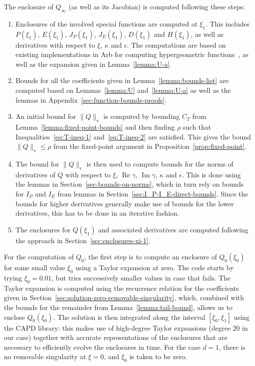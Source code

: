 \documentclass[11pt]{article}
\DeclareMathOperator{\real}{Re}
\DeclareMathOperator{\imag}{Im}
\newcommand{\normv}{\mathrm{v}}
\newcommand{\codenumber}[1]{#1} %
\begin{document}
The enclosure of \(Q_{\infty}\) (as well as its Jacobian) is computed
following these steps:
\begin{enumerate}
\item Enclosures of the involved special functions are computed at
  \(\xi_{1}\). This includes \(P(\xi_{1})\), \(E(\xi_{1})\),
  \(J_{P}(\xi_{1})\), \(J_{E}(\xi_{1})\), \(D(\xi_{1})\) and
  \(H(\xi_{1})\), as well as derivatives with respect to \(\xi\),
  \(\kappa\) and \(\epsilon\). The computations are based on existing
  implementations in Arb for computing hypergeometric
  functions~\cite{Johansson2019}, as well as the expansion given in
  Lemma~\ref{lemma:U-a}.
\item Bounds for all the coefficients given in
  Lemma~\ref{lemma:bounds-list} are computed based on
  Lemmas~\ref{lemma:U} and~\ref{lemma:U-a} as well as the lemmas in
  Appendix~\ref{sec:function-bounds-proofs}.
\item An initial bound for \(\|Q\|_{\normv}\) is computed by bounding
  \(C_{T}\) from Lemma~\ref{lemma:fixed-point-bounds} and then finding
  \(\rho\) such that Inequalities~\eqref{eq:T-ineq-1}
  and~\eqref{eq:T-ineq-2} are satisfied. This gives the bound
  \(\|Q\|_{\normv} \leq \rho\) from the fixed-point argument in
  Proposition~\ref{prop:fixed-point}.
\item The bound for \(\|Q\|_{\normv}\) is then used to compute bounds
  for the norms of derivatives of \(Q\) with respect to \(\xi\),
  \(\real\gamma\), \(\imag\gamma\), \(\kappa\) and \(\epsilon\). This
  is done using the lemmas in Section~\ref{sec:bounds-on-norms}, which
  in turn rely on bounds for \(I_{P}\) and \(I_{E}\) from lemmas in
  Section~\ref{sec:I_P-I_E-direct-bounds}. Since the bounds for higher
  derivatives generally make use of bounds for the lower derivatives,
  this has to be done in an iterative fashion.
\item The enclosures for \(Q(\xi_{1})\) and associated derivatives are
  computed following the approach in
  Section~\ref{sec:enclosures-xi-1}.
\end{enumerate}

For the computation of \(Q_{0}\), the first step is to compute an
enclosure of \(Q_{0}(\xi_{0})\) for some small value \(\xi_{0}\) using
a Taylor expansion at zero. The code starts by trying
\(\xi_{0} = \codenumber{0.01}\), but tries successively smaller values
in case that fails. The Taylor expansion is computed using the
recurrence relation for the coefficients given in
Section~\ref{sec:solution-zero-removable-singularity}, which, combined
with the bounds for the remainder from Lemma~\ref{lemma:tail-bound},
allows us to enclose \(Q_{0}(\xi_{0})\). The solution is then
integrated along the interval \([\xi_{0}, \xi_{1}]\) using the CAPD
library: this makes use of high-degree Taylor expansions (degree
\codenumber{20} in our case) together with accurate representations of
the enclosures that are necessary to efficiently evolve the enclosures
in time. For the case \(d = 1\), there is no removable singularity at
\(\xi = 0\), and \(\xi_{0}\) is taken to be zero.
\end{document}
